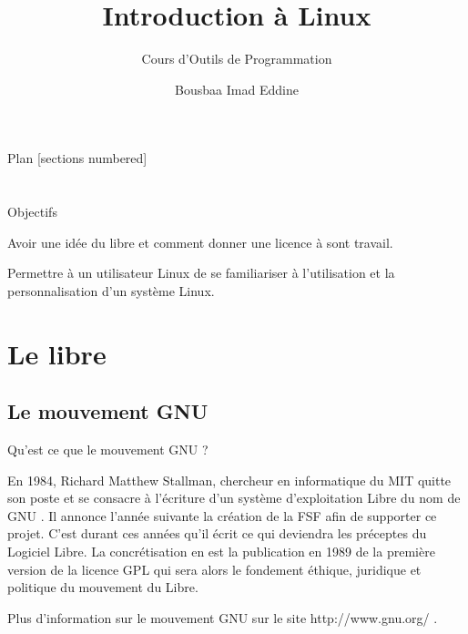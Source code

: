 \documentclass[10pt]{beamer}
\title{Introduction à Linux}
\subtitle{Cours d'Outils de Programmation}
\date{}
\author{Bousbaa Imad Eddine}
\institute{Université des Sciences et de la Technologie de Houari Boumediène}
\begin{document}
\maketitle

\begin{frame}{Plan}
  [sections numbered]
  \tableofcontents[hideallsubsections]
\end{frame}

\section{}

\begin{frame}[fragile]{Objectifs}

Avoir une idée du libre et comment donner une licence à sont travail.

Permettre à un utilisateur Linux de se familiariser à l'utilisation et la personnalisation d'un
système Linux.\\

\end{frame}

\section{Le libre}
\subsection{Le mouvement GNU}
\begin{frame}[fragile]{Qu'est ce que le mouvement GNU ?}

  En 1984, Richard Matthew Stallman, chercheur en informatique du MIT quitte son
poste et se consacre à l’écriture d’un système d’exploitation Libre du nom de GNU .
Il annonce l’année suivante la création de la FSF afin de supporter ce projet.
C'est durant ces années qu'il écrit ce qui deviendra les préceptes du Logiciel Libre.
La concrétisation en est la publication en 1989 de la première version de la licence
GPL qui sera alors le fondement éthique, juridique et politique du mouvement du
Libre. 

Plus d’information sur le mouvement GNU sur le site http://www.gnu.org/ .
\end{frame}
\end{document}
